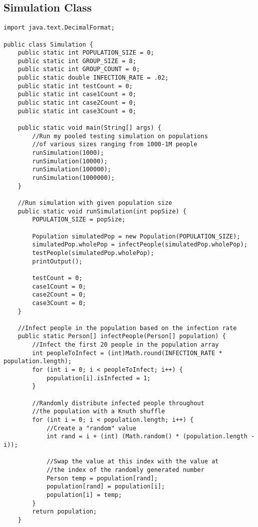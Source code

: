 \documentclass[letterpaper, 10pt,DIV=13]{scrartcl}
\numberwithin{equation}{section} %
\numberwithin{figure}{section} %
\numberwithin{table}{section} %
\begin{document}
\subsection{Simulation Class}
\begin{lstlisting}
import java.text.DecimalFormat;

public class Simulation { 
    public static int POPULATION_SIZE = 0;
    public static int GROUP_SIZE = 8;
    public static int GROUP_COUNT = 0;
    public static double INFECTION_RATE = .02;
    public static int testCount = 0;
    public static int case1Count = 0;
    public static int case2Count = 0;
    public static int case3Count = 0;

    public static void main(String[] args) {
        //Run my pooled testing simulation on populations 
        //of various sizes ranging from 1000-1M people
        runSimulation(1000);
        runSimulation(10000);
        runSimulation(100000);
        runSimulation(1000000);
    }

    //Run simulation with given population size
    public static void runSimulation(int popSize) {
        POPULATION_SIZE = popSize;
        
        Population simulatedPop = new Population(POPULATION_SIZE);
        simulatedPop.wholePop = infectPeople(simulatedPop.wholePop);
        testPeople(simulatedPop.wholePop);
        printOutput();

        testCount = 0;
        case1Count = 0;
        case2Count = 0;
        case3Count = 0;
    }

    //Infect people in the population based on the infection rate
    public static Person[] infectPeople(Person[] population) {
        //Infect the first 20 people in the population array
        int peopleToInfect = (int)Math.round(INFECTION_RATE * population.length);
        for (int i = 0; i < peopleToInfect; i++) {
            population[i].isInfected = 1;
        }

        //Randomly distribute infected people throughout
        //the population with a Knuth shuffle
        for (int i = 0; i < population.length; i++) {
            //Create a "random" value
            int rand = i + (int) (Math.random() * (population.length - i));
            
            //Swap the value at this index with the value at 
            //the index of the randomly generated number
            Person temp = population[rand];
            population[rand] = population[i];
            population[i] = temp;
        }
        return population;
    }


\end{lstlisting}
\end{document}
